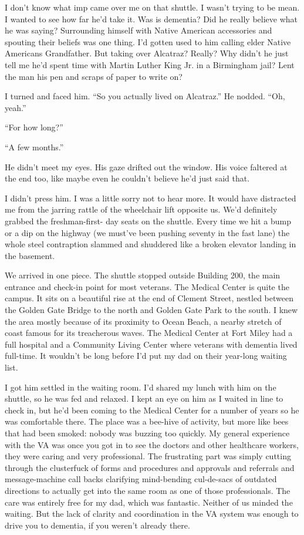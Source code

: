 \documentclass[12pt]{book}
\begin{document}
I don't know what imp came over me on that shuttle. I wasn't trying to be mean. I wanted to see how far he'd take it. Was is dementia? Did he really believe what he was saying? Surrounding himself with Native American accessories and spouting their beliefs was one thing. I'd gotten used to him calling elder Native Americans Grandfather. But taking over Alcatraz? Really? Why didn't he just tell me he'd spent time with Martin Luther King Jr. in a Birmingham jail? Lent the man his pen and scraps of paper to write on?

I turned and faced him. ``So you actually lived on Alcatraz.'' He nodded. ``Oh, yeah.''

``For how long?''

``A few months.''

He didn't meet my eyes. His gaze drifted out the window. His voice faltered at the end too, like maybe even he couldn't believe he'd just said that.

I didn't press him. I was a little sorry not to hear more. It would have distracted me from the jarring rattle of the wheelchair lift opposite us. We'd definitely grabbed the freshman-first- day seats on the shuttle. Every time we hit a bump or a dip on the highway (we must've been pushing seventy in the fast lane) the whole steel contraption slammed and shuddered like a broken elevator landing in the basement.

We arrived in one piece. The shuttle stopped outside Building 200, the main entrance and check-in point for most veterans. The Medical Center is quite the campus. It sits on a beautiful rise at the end of Clement Street, nestled between the Golden Gate Bridge to the north and Golden Gate Park to the south. I knew the area mostly because of its proximity to Ocean Beach, a nearby stretch of coast famous for its treacherous waves. The Medical Center at Fort Miley had a full hospital and a Community Living Center where veterans with dementia lived full-time. It wouldn't be long before I'd put my dad on their year-long waiting list.

I got him settled in the waiting room. I'd shared my lunch with him on the shuttle, so he was fed and relaxed. I kept an eye on him as I waited in line to check in, but he'd been coming to the Medical Center for a number of years so he was comfortable there. The place was a bee-hive of activity, but more like bees that had been smoked: nobody was buzzing too quickly. My general experience with the VA was once you got in to see the doctors and other healthcare workers, they were caring and very professional. The frustrating part was simply cutting through the clusterfuck of forms and procedures and approvals and referrals and message-machine call backs clarifying mind-bending cul-de-sacs of outdated directions to actually get into the same room as one of those professionals. The care was entirely free for my dad, which was fantastic. Neither of us minded the waiting. But the lack of clarity and coordination in the VA system was enough to drive you to dementia, if you weren't already there.
\end{document}
